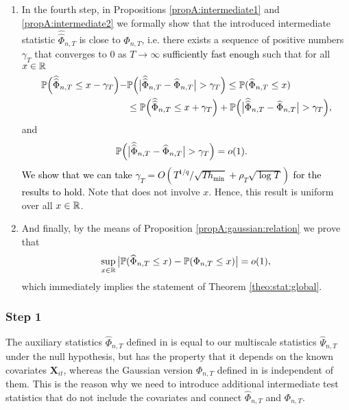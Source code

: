 \documentclass[a4paper,12pt]{article}
\makeatletter
\renewcommand{\eqref}[1]{\tagform@{\ref{#1}}}
\newcommand{\doublehattwo}[1]{\widehat{\widehat{#1}}}
\makeatother
\begin{document}
\begin{enumerate}
\item In the fourth step, in Propositions \ref{propA:intermediate1} and \ref{propA:intermediate2} we formally show that the introduced intermediate statistic $\doublehattwo{\Phi}_{n, T}$ is close to $\widehat{\Phi}_{n, T}$, i.e. there exists a sequence of positive numbers $\gamma_{T}$ that converges to $0$ as $T \to \infty$ \textcolor{black}{ sufficiently fast enough} such that for all $x\in \mathbb{R}$ 
\begin{align*}
\pr\Big(\doublehattwo{\Phi}_{n,T} \le x - \gamma_{T}\Big) - &\pr \Big(\big|\doublehattwo{\Phi}_{n,T} - \widehat{\Phi}_{n,T}\big| > \gamma_{T} \Big)\le \pr(\widehat{\Phi}_{n, T} \le x) \\
&\le\pr\Big(\doublehattwo{\Phi}_{n,T} \le x + \gamma_{T}\Big) + \pr \Big(\big|\doublehattwo{\Phi}_{n,T} - \widehat{\Phi}_{n,T}\big| > \gamma_{T} \Big),
\end{align*}
and
\begin{align}\label{eqA:intermediate1}
\pr \Big(\big|\doublehattwo{\Phi}_{n,T} &- \widehat{\Phi}_{n,T}\big| > \gamma_{T} \Big) = o(1).
\end{align}
\textcolor{black}{We show that we can take $\gamma_T = O(T^{1/q} / \sqrt{T h_{\min}} + \rho_T \sqrt{\log T})$ for the results to hold.} Note that \eqref{eqA:intermediate1} does not involve $x$. Hence, this result is uniform over all $x \in \mathbb{R}$. 

\item And finally, by the means of Proposition \ref{propA:gaussian:relation} we prove that  
\begin{equation*}
\sup_{x \in \mathbb{R}} \big| \mathbb{P}(\widehat{\Phi}_{n, T} \le x) - \mathbb{P}(\Phi_{n,T} \le x) \big| = o(1),
\end{equation*}
which immediately implies the statement of Theorem \ref{theo:stat:global}.
\end{enumerate}

\subsubsection*{Step 1}

The auxiliary statistics $\widehat{\Phi}_{n,T}$ defined in \eqref{eq:Phi_hat} is equal to our multiscale statistics $\widehat{\Psi}_{n,T}$ under the null hypothesis, but has the property that it depends on the known covariates $\mathbf{X}_{it}$, whereas the Gaussian version $\Phi_{n,T}$ defined in \eqref{eq:Phi} is independent of them. This is the reason why we need to introduce additional intermediate test statistics that do not include the covariates and connect $\widehat{\Phi}_{n,T}$ and $\Phi_{n,T}$. 
\end{document}
